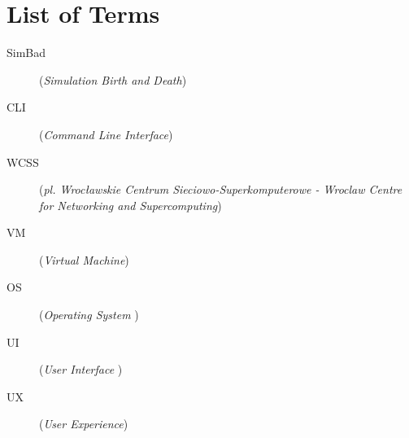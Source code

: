 \chapter*{List of Terms}\mbox{}
\label{sec:skroty}
\noindent
\begin{description}
  \item [SimBad] (\emph{Simulation Birth and Death})
  \item [CLI] (\emph{Command Line Interface})
  \item [WCSS] (\emph{pl. Wrocławskie Centrum Sieciowo-Superkomputerowe - Wroclaw Centre for Networking and Supercomputing})
  \item [VM] (\emph{Virtual Machine})
  \item [OS] (\emph{Operating System })
  \item [UI] (\emph{User Interface })
  \item [UX] (\emph{User Experience})
  
\end{description}

